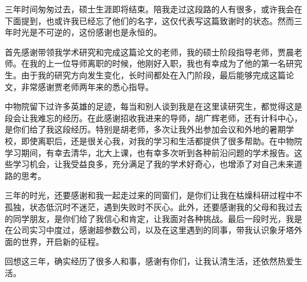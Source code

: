 

三年时间匆匆过去，硕士生涯即将结束。陪我走过这段路的人有很多，或许我会在下面提到，也或许我已经忘了他们的名字，这仅代表写这篇致谢时的状态。然而三年时光是不可逆的，这份感谢也是永恒的。

首先感谢带领我学术研究和完成这篇论文的老师，我的硕士阶段指导老师，贾晨老师。在我的上一位导师离职的时候，他刚好入职，我也有幸成为了他的第一名研究生。由于我的研究方向发生变化，长时间都处在入门阶段，最后能够完成这篇论文，非常感谢贾老师两年来的悉心指导。

中物院留下过许多英雄的足迹，每当和别人谈到我是在这里读研究生，都觉得这是段会让我难忘的经历。在此感谢招收我进来的导师，胡广辉老师，还有计科中心，是你们给了我这段经历。特别是胡老师，多次让我外出参加会议和外地的暑期学校，即使离职后，还是很关心我，对我的学习和生活都提供了很多帮助。在中物院学习期间，有幸去清华，北大上课，也有幸多次听到各种前沿问题的学术报告。这些学习机会，让我受益良多，充分满足了我的学术好奇心，也增添了对自己未来道路的思考。

三年的时光，还要感谢和我一起走过来的同窗们，是你们让我在枯燥科研过程中不孤独，状态低沉时不迷茫，遇到失败时不灰心。此外，还要感谢我的父母和我过去的同学朋友，是你们给了我信心和肯定，让我面对各种挑战。最后一段时光，我是在公司实习中度过，感谢超参数公司，以及在这里遇到的同事，带我认识象牙塔外面的世界，开启新的征程。

回想这三年，确实经历了很多人和事，感谢有你们，让我认清生活，还依然热爱生活。
